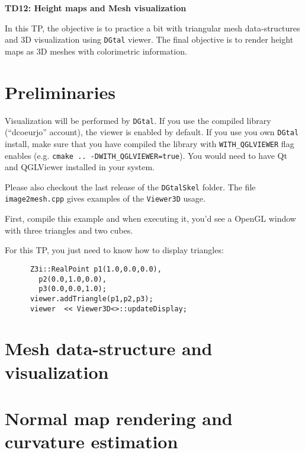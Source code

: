 \documentclass[a4paper, 11pt]{article}
\title{}
\author{}
\date{}
\begin{document}
\begin{center}
	\LARGE \textbf{TD12: Height maps and Mesh visualization}
\end{center}

\bigskip
\par In this TP, the objective is to practice a bit with triangular
mesh data-structures and 3D visualization using \texttt{DGtal}
viewer. The final objective is to render height maps as 3D meshes with
colorimetric information.

\section{Preliminaries}

Visualization will be performed by \texttt{DGtal}. If you use the
compiled library (``dcoeurjo'' account), the viewer is enabled by
default. If you use you own \texttt{DGtal} install, make sure that you
have compiled the library with \texttt{WITH\_QGLVIEWER} flag enables
(e.g. \texttt{cmake .. -DWITH\_QGLVIEWER=true}). You would need to
have Qt and QGLViewer installed in your system.

Please also checkout the last release of the \texttt{DGtalSkel} folder. The
file \texttt{image2mesh.cpp} gives examples of the \texttt{Viewer3D}
usage.

First, compile this example and when executing it, you'd see a OpenGL
window with three triangles and two cubes.

For this TP, you just need to know how to display triangles:
\begin{verbatim}
      Z3i::RealPoint p1(1.0,0.0,0.0),
        p2(0.0,1.0,0.0),
        p3(0.0,0.0,1.0);
      viewer.addTriangle(p1,p2,p3);
      viewer  << Viewer3D<>::updateDisplay;
\end{verbatim}


\section{Mesh data-structure and visualization}



\section{Normal map rendering and curvature estimation}
\end{document}
